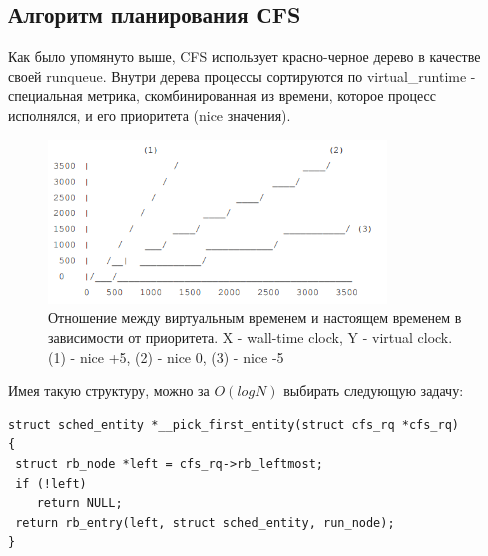 \documentclass{article}
\begin{document}
\subsection{Алгоритм планирования СFS}
Как было упомянуто выше, CFS использует красно-черное дерево в качестве своей runqueue. Внутри дерева процессы сортируются по virtual\_runtime - специальная метрика, скомбинированная из времени, которое процесс исполнялся, и его приоритета (nice значения). \\
\begin{figure}[h]
    \centering
    \includegraphics[width=0.8\textwidth]{images/scheduling.png}
    \caption{Отношение между виртуальным временем и настоящем временем в зависимости от приоритета. X - wall-time clock, Y - virtual clock. (1) - nice +5, (2) - nice 0, (3) - nice -5}
    \label{fig:mesh1}
\end{figure}

\pagebreak
Имея такую структуру, можно за $O(log N)$ выбирать следующую задачу:
\begin{lstlisting}
struct sched_entity *__pick_first_entity(struct cfs_rq *cfs_rq)
{
 struct rb_node *left = cfs_rq->rb_leftmost;
 if (!left)
    return NULL;
 return rb_entry(left, struct sched_entity, run_node);
}
\end{lstlisting}
\end{document}
